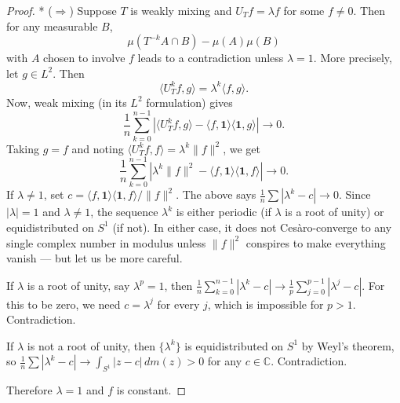 \begin{proof}
* ($\Rightarrow$) Suppose $T$ is weakly mixing and $U_T f = \lambda f$ for some $f \ne 0$. Then for any measurable $B$,
\[
\mu(T^{-k}A \cap B) - \mu(A)\mu(B)
\]
with $A$ chosen to involve $f$ leads to a contradiction unless $\lambda = 1$. More precisely, let $g \in L^2$. Then
\[
\langle U_T^k f, g \rangle = \lambda^k \langle f, g \rangle.
\]
Now, weak mixing (in its $L^2$ formulation) gives
\[
\frac{1}{n}\sum_{k=0}^{n-1} \left| \langle U_T^k f, g \rangle - \langle f, \mathbf{1}\rangle \langle \mathbf{1}, g \rangle \right| \to 0.
\]
Taking $g = f$ and noting $\langle U_T^k f, f\rangle = \lambda^k \|f\|^2$, we get
\[
\frac{1}{n}\sum_{k=0}^{n-1} \left| \lambda^k \|f\|^2 - \langle f, \mathbf{1}\rangle \langle \mathbf{1}, f \rangle \right| \to 0.
\]
If $\lambda \ne 1$, set $c = \langle f, \mathbf{1}\rangle\langle \mathbf{1}, f\rangle / \|f\|^2$. The above says $\frac{1}{n}\sum |\lambda^k - c| \to 0$. Since $|\lambda| = 1$ and $\lambda \ne 1$, the sequence $\lambda^k$ is either periodic (if $\lambda$ is a root of unity) or equidistributed on $S^1$ (if not). In either case, it does not Cesàro-converge to any single complex number in modulus unless $\|f\|^2$ conspires to make everything vanish --- but let us be more careful.

If $\lambda$ is a root of unity, say $\lambda^p = 1$, then $\frac{1}{n}\sum_{k=0}^{n-1}|\lambda^k - c| \to \frac{1}{p}\sum_{j=0}^{p-1}|\lambda^j - c|$. For this to be zero, we need $c = \lambda^j$ for every $j$, which is impossible for $p > 1$. Contradiction.

If $\lambda$ is not a root of unity, then $\{\lambda^k\}$ is equidistributed on $S^1$ by Weyl's theorem, so $\frac{1}{n}\sum |\lambda^k - c| \to \int_{S^1} |z - c| \, dm(z) > 0$ for any $c \in \mathbb{C}$. Contradiction.

Therefore $\lambda = 1$ and $f$ is constant.


\end{proof}
